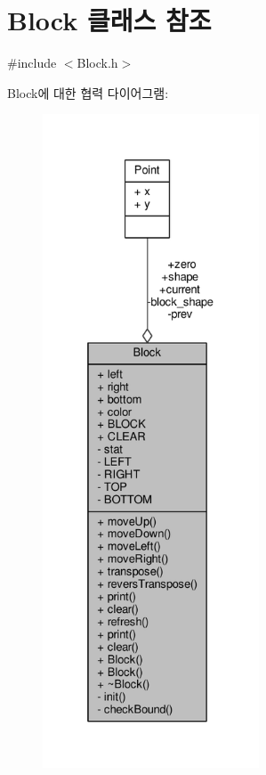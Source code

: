 \hypertarget{class_block}{}\section{Block 클래스 참조}
\label{class_block}


{\ttfamily \#include $<$Block.\+h$>$}



Block에 대한 협력 다이어그램\+:
\nopagebreak
\begin{figure}[H]
\begin{center}
\leavevmode
\includegraphics[height=550pt]{class_block__coll__graph}
\end{center}
\end{figure}
